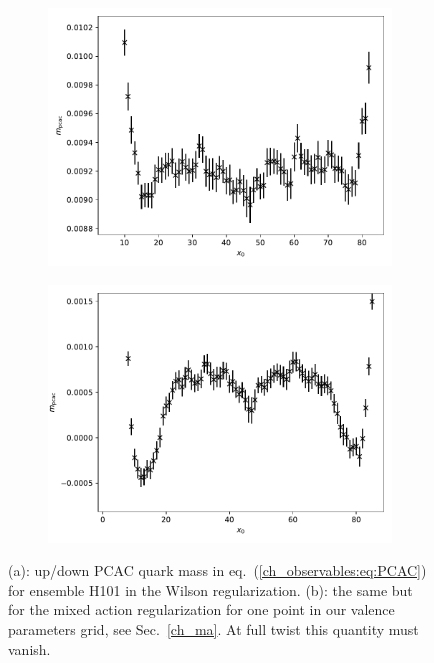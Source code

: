 \begin{figure}
    \centering
    \begin{subfigure}{1.\textwidth}
    	\includegraphics[width=\textwidth]{./cap3/figs/mpcac_H101.pdf}
    	\caption{}
    \end{subfigure}
    \begin{subfigure}{1.\textwidth}
    	\includegraphics[width=\textwidth]{./cap3/figs/mpcac_tm_H101.pdf}
    	\caption{}
    \end{subfigure}
    \caption{(a): up/down PCAC quark mass in eq.~(\ref{ch_observables:eq:PCAC}) for ensemble H101 in the Wilson regularization. (b): the same but for the mixed action regularization for one point in our valence parameters grid, see Sec.~\ref{ch_ma}. At full twist this quantity must vanish.}
        \label{ch_observables:fig:mpcac}
\end{figure}

